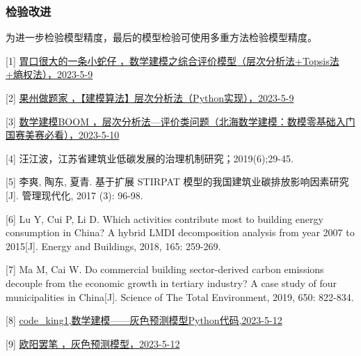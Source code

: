 \documentclass[a4paper, 12pt]{article}
\numberwithin{equation}{section}
\begin{document}
            \subsubsection{检验改进}
                为进一步检验模型精度，最后的模型检验可使用多重方法检验模型精度。


    {}
    [1] \href{https://blog.csdn.net/qq_53133234/article/details/124124031}{胃口很大的一条小蛇仔 ，数学建模之综合评价模型（层次分析法+Topsis法+熵权法），2023-5-9}

    [2] \href{https://blog.csdn.net/baidu/article/details/125050963?ops_request_misc=%257B%2522request%255Fid%2522%253A%2522168403226916782425189461%2522%252C%2522scm%2522%253A%252220140713.130102334..%2522%257D&request_id=168403226916782425189461&biz_id=0&utm_medium=distribute.pc_search_result.none-task-blog-2~all~top_positive~default-2-125050963-null-null.142%5ev87%5einsert_down1,239%5ev2%5einsert_chatgpt&utm_term=%E5%B1%82%E6%AC%A1%E5%88%86%E6%9E%90%E6%B3%95python&spm=1018.2226.3001.4187}{果州做题家 ，【建模算法】层次分析法（Python实现），2023-5-9}

    [3] \href{https://www.bilibili.com/video/BV1Ja41117Af/?spm_id_from=333.337.search-card.all.click&vd_source=f44ef83a1a68e357572cad74e3747665}{数学建模BOOM ，层次分析法—评价类问题（北海数学建模：数模零基础入门 国赛美赛必看），2023-5-10}

    [4] 汪江波，江苏省建筑业低碳发展的治理机制研究；2019(6);29-45.

    [5] 李爽, 陶东, 夏青. 基于扩展 STIRPAT 模型的我国建筑业碳排放影响因素研究[J]. 管理现代化, 2017 (3): 96-98.

    [6] Lu Y, Cui P, Li D. Which activities contribute most to building energy consumption in China? A hybrid LMDI decomposition analysis from year 2007 to 2015[J]. Energy and Buildings, 2018, 165: 259-269.

    [7] Ma M, Cai W. Do commercial building sector-derived carbon emissions decouple from the economic growth in tertiary industry? A case study of four municipalities in China[J]. Science of The Total Environment, 2019, 650: 822-834.

    [8] \href{https://blog.csdn.net/qq_45934521/article/details/118972081}{code\_king1,数学建模——灰色预测模型Python代码,2023-5-12}

    [9] \href{https://blog.csdn.net/qq_39798423/article/details/89283000?ops_request_misc=%257B%2522request%255Fid%2522%253A%2522168403384516800226564459%2522%252C%2522scm%2522%253A%252220140713.130102334..%2522%257D&request_id=168403384516800226564459&biz_id=0&utm_medium=distribute.pc_search_result.none-task-blog-2~all~top_positive~default-2-89283000-null-null.142%5ev87%5einsert_down1,239%5ev2%5einsert_chatgpt&utm_term=%E7%81%B0%E8%89%B2%E9%A2%84%E6%B5%8B%E6%A8%A1%E5%9E%8B&spm=1018.2226.3001.4187}{欧阳罢笔 ，灰色预测模型，2023-5-12}
\end{document}
